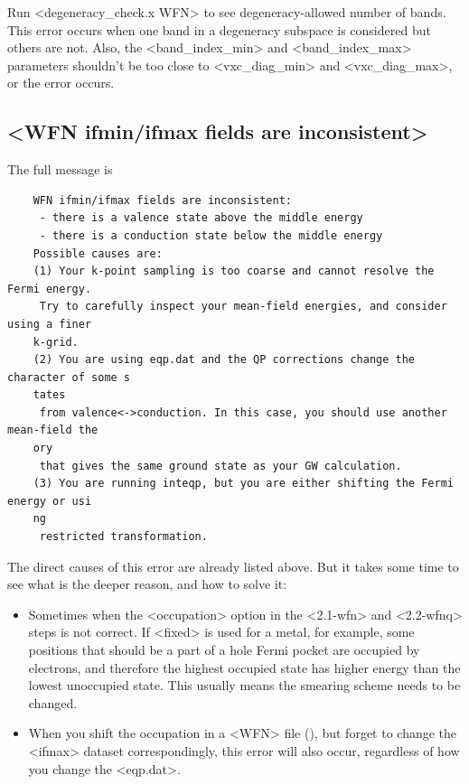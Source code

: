 \documentclass[hyperref, a4paper, 12pt]{report}
\def\texttt#1{<#1>}%
\newcommand{\shortcode}[1]{\texttt{#1}}
\begin{document}
Run \shortcode{degeneracy_check.x WFN} to see degeneracy-allowed number of bands.
This error occurs when one band in a degeneracy subspace is considered 
but others are not.
Also, the \shortcode{band_index_min} and \shortcode{band_index_max} parameters
shouldn't be too close to \shortcode{vxc_diag_min} and \shortcode{vxc_diag_max}, 
or the error occurs.

\subsection{\shortcode{WFN ifmin/ifmax fields are inconsistent}}\label{sec:semimetal-error-1}

The full message is 
\begin{lstlisting}
    WFN ifmin/ifmax fields are inconsistent:
     - there is a valence state above the middle energy
     - there is a conduction state below the middle energy
    Possible causes are:
    (1) Your k-point sampling is too coarse and cannot resolve the Fermi energy.
     Try to carefully inspect your mean-field energies, and consider using a finer 
    k-grid.
    (2) You are using eqp.dat and the QP corrections change the character of some s
    tates
     from valence<->conduction. In this case, you should use another mean-field the
    ory
     that gives the same ground state as your GW calculation.
    (3) You are running inteqp, but you are either shifting the Fermi energy or usi
    ng 
     restricted transformation.   
\end{lstlisting}

The direct causes of this error are already listed above.
But it takes some time to see what is the deeper reason, 
and how to solve it:
\begin{itemize}
    \item Sometimes when the \shortcode{occupation} option 
    in the \shortcode{2.1-wfn} and \shortcode{2.2-wfnq} steps 
    is not correct.
    If \shortcode{fixed} is used for a metal, for example, 
    some positions that should be a part of a hole Fermi pocket 
    are occupied by electrons,
    and therefore the highest occupied state has higher energy than the lowest unoccupied state.
    This usually means the smearing scheme needs to be changed.
    \item When you shift the occupation in a \shortcode{WFN} file (), 
    but forget to change the \shortcode{ifmax} dataset correspondingly, 
    this error will also occur,
    regardless of how you change the \shortcode{eqp.dat}.
\end{itemize}
\end{document}
